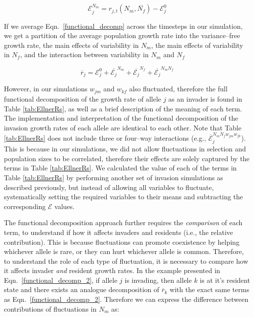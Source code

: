 \begin{equation}
  \mathcal{E}_{j}^{N_{m}} = r_{j,t}(N_{m},\overline{N_{f}}) - \mathcal{E}_{j}^{0}
\end{equation}

If we average Eqn.~\ref{functional_decomp} across the timesteps in our simulation, we get a partition of the average population growth rate into the variance--free growth rate, the main effects of variability in $N_{m}$, the main effects of variability in $N_{f}$, and the interaction between variability in $N_{m}$ and $N_{f}$

\begin{equation}
    \overline{r}_{j}= \mathcal{E}_{j}^{0} + \overline{\mathcal{E}_{j}}^{N_{m}}+ \overline{\mathcal{E}_{j}}^{N_{f}}+ \overline{\mathcal{E}_{j}}^{N_{m}N_{f}}
   \label{functional_decomp_2}
\end{equation}

 However, in our simulations $w_{jm}$ and $w_{kf}$ also fluctuated, therefore the full functional decomposition of the growth rate of allele $j$ as an invader is found in Table \ref{tab:EllnerRs}, as well as a brief description of the meaning of each term. The implementation and interpretation of the functional decomposition of the invasion growth rates of each allele are identical to each other. Note that Table \ref{tab:EllnerRs} does not include three or four--way interactions (e.g., $\overline{\mathcal{E}}^{N_{m}N_{f}w_{jm}w_{fk}}_{j}$). This is because in our simulations, we did not allow fluctuations in selection and population sizes to be correlated, therefore their effects are solely captured by the terms in Table \ref{tab:EllnerRs}. We calculated the value of each of the terms in Table \ref{tab:EllnerRs} by performing another set of invasion simulations as described previously, but instead of allowing all variables to fluctuate, systematically setting the required variables to their means and subtracting the corresponding $\mathcal{E}$ values.


The functional decomposition approach further requires the \textit{comparison} of each term, to understand if how it affects invaders and residents (i.e., the relative contribution). This is because fluctuations can promote coexistence by helping whichever allele is rare, or they can hurt whichever allele is common. Therefore, to understand the role of each type of fluctuation, it is necessary to compare how it affects invader \textit{and} resident growth rates. In the example presented in Eqn.~\ref{functional_decomp_2}, if allele $j$ is invading, then allele $k$ is at it's resident state and there exists an analogue decomposition of $\overline{r}_{k}$ with the exact same terms as Eqn.~\ref{functional_decomp_2}. Therefore we can express the difference between contributions of fluctuations in $N_{m}$ as:


